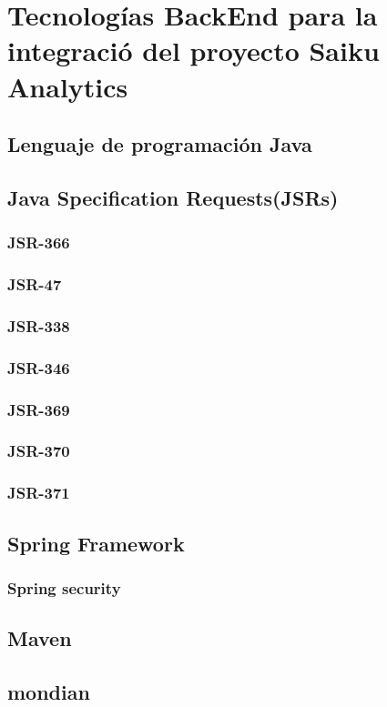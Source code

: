 \section{Tecnolog\'{i}as BackEnd para la integraci\'{o} del proyecto Saiku Analytics}
	\subsection{Lenguaje de programaci\'{o}n Java}
	\subsection{Java Specification Requests(JSRs)}
		\subsubsection{JSR-366}
		\subsubsection{JSR-47}
		\subsubsection{JSR-338}
		\subsubsection{JSR-346}
		\subsubsection{JSR-369}
		\subsubsection{JSR-370}
		\subsubsection{JSR-371}
	\subsection{Spring Framework}
		\subsubsection{Spring security}
	\subsection{Maven}
	\subsection{mondian}
